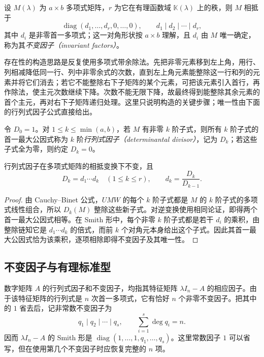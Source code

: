 \begin{theorem}
\label{thm:xie-ex-sim-smith}
设 $M(\lambda)$ 为 $a\times b$ 多项式矩阵，$r$ 为它在有理函数域 $\mathbb K(\lambda)$ 上的秩，则 $M$ 相抵于
\[
 \operatorname{diag}(d_1,\ldots,d_r,0,\ldots,0),
 \qquad d_1\mid d_2\mid\cdots\mid d_r,
\]
其中 $d_i$ 是非零首一多项式；这一对角形状按 $a\times b$ 理解，且 $d_i$ 由 $M$ 唯一确定，称为其\emph{不变因子（invariant factors）}。
\end{theorem}

存在性的构造思路是反复使用多项式带余除法。先把非零元素移到左上角，用行、列相减降低同一行、列中非零余式的次数，直到左上角元素能整除这一行和列的元素并将它们消去；若它不能整除右下子矩阵的某个元素，可把该元素引入首行，再作除法，使主元次数继续下降。次数不能无限下降，故最终得到能整除其余元素的首个主元，再对右下子矩阵递归处理。这里只说明构造的关键步骤；唯一性由下面的行列式因子公式直接给出。

\begin{definition}
令 $D_0=1$。对 $1\leq k\leq\min(a,b)$，若 $M$ 有非零 $k$ 阶子式，则所有 $k$ 阶子式的首一最大公因式称为 $k$ 阶\emph{行列式因子（determinantal divisor）}，记为 $D_k$；若这些子式全为零，则约定 $D_k=0$。
\end{definition}

\begin{proposition}
\label{prop:xie-ex-sim-divisors}
行列式因子在多项式矩阵的相抵变换下不变，且
\begin{equation}
 D_k=d_1\cdots d_k\quad(1\leq k\leq r),
 \qquad d_k=\frac{D_k}{D_{k-1}}.
 \label{eq:xie-ex-sim-divisors}
\end{equation}
\end{proposition}
\begin{proof}
由 Cauchy--Binet 公式，$UMW$ 的每个 $k$ 阶子式都是 $M$ 的 $k$ 阶子式的多项式线性组合，所以 $D_k(M)$ 整除这些新子式。对逆变换使用相同论证，即得两个首一最大公因式相等。在 Smith 形中，每个非零 $k$ 阶子式都是若干 $d_i$ 的乘积，由整除链知它是 $d_1\cdots d_k$ 的倍式，而前 $k$ 个对角元本身给出这个子式。因此其首一最大公因式恰为该乘积，逐项相除即得不变因子及其唯一性。
\end{proof}

\subsection{不变因子与有理标准型}

数字矩阵 $A$ 的行列式因子和不变因子，均指其特征矩阵 $\lambda I_n-A$ 的相应因子。由于该特征矩阵的行列式是 $n$ 次首一多项式，它有恰好 $n$ 个非零不变因子。把其中的 $1$ 省去后，记非常数不变因子为
\[
 q_1\mid q_2\mid\cdots\mid q_s,
 \qquad \sum_{i=1}^s\deg q_i=n.
\]
因而 $\lambda I_n-A$ 的 Smith 形是 $\operatorname{diag}(1,\ldots,1,q_1,\ldots,q_s)$。这里常数因子 $1$ 可以省写，但在使用第几个不变因子时应恢复完整的 $n$ 项。

